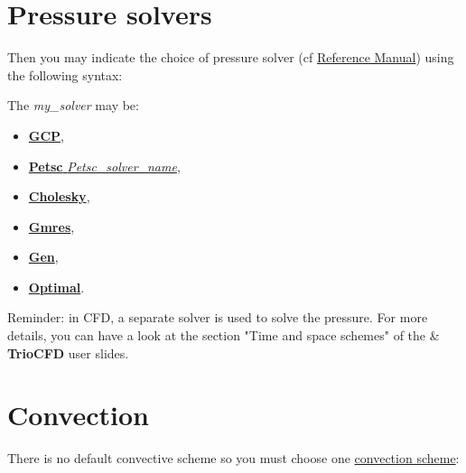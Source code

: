 \section{Pressure solvers}
Then you may indicate the choice of pressure solver (cf \href{\REFERENCEMANUAL\#solveursysbase}{\trustref Reference Manual}) using the following syntax:
    \begin{center}
    \end{center}

The \textit{my\_solver} may be:

\begin{itemize}
\item \href{\REFERENCEMANUAL\#solvgcp}{\textbf{GCP}},
\item \href{\REFERENCEMANUAL\#petsc}{\textbf{Petsc} \textit{Petsc\_solver\_name}},
\item \href{\REFERENCEMANUAL\#cholesky}{\textbf{Cholesky}},
\item \href{\REFERENCEMANUAL\#gmres}{\textbf{Gmres}},
\item \href{\REFERENCEMANUAL\#gen}{\textbf{Gen}},
\item \href{\REFERENCEMANUAL\#optimal}{\textbf{Optimal}}.
\end{itemize}

Reminder: in CFD, a separate solver is used to solve the pressure. For more details, you can have a look at the section "Time and space schemes" of the \trust \& \textbf{TrioCFD} user slides.



\section{Convection}
There is no default convective scheme so you must choose one \href{\REFERENCEMANUAL\#blocconvection}{convection scheme}:
    \begin{center}
    \end{center}

